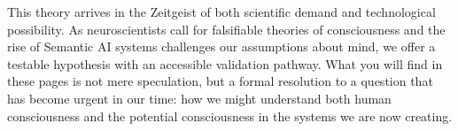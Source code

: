 \documentclass[runningheads]{llncs}
\begin{document}
This theory arrives in the Zeitgeist of both scientific demand and technological possibility. As neuroscientists call for falsifiable theories of consciousness and the rise of Semantic AI systems challenges our assumptions about mind, we offer a testable hypothesis with an accessible validation pathway. What you will find in these pages is not mere speculation, but a formal resolution to a question that has become urgent in our time: how we might understand both human consciousness and the potential consciousness in the systems we are now creating.

\end{document}
